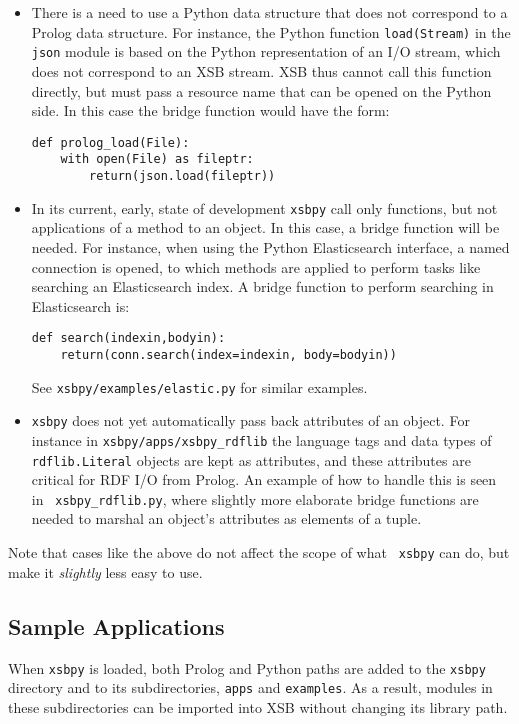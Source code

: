 \begin{itemize}
  \item There is a need to use a Python data structure that does not
    correspond to a Prolog data structure.  For instance, the Python
    function {\tt load(Stream)} in the {\tt json} module is based on
    the Python representation of an I/O stream, which does not
    correspond to an XSB stream.  XSB thus cannot call this function
    directly, but must pass a resource name that can be opened on the
    Python side.  In this case the bridge function would have the
    form:

\begin{verbatim}   
def prolog_load(File):
    with open(File) as fileptr:
        return(json.load(fileptr))
\end{verbatim}

\item In its current, early, state of development {\tt xsbpy} call
  only functions, but not applications of a method to an object. In
  this case, a bridge function will be needed.  For instance, when
  using the Python Elasticsearch interface, a named connection is
  opened, to which methods are applied to perform tasks like searching
  an Elasticsearch index.  A bridge function to perform searching in
  Elasticsearch is:

\begin{verbatim}
def search(indexin,bodyin):
    return(conn.search(index=indexin, body=bodyin))
\end{verbatim}

\noindent
See {\tt xsbpy/examples/elastic.py} for similar examples.

\item {\tt xsbpy} does not yet automatically pass back attributes of
  an object.  For instance in {\tt xsbpy/apps/xsbpy\_rdflib} the
  language tags and data types of {\tt rdflib.Literal} objects are
  kept as attributes, and these attributes are critical for RDF I/O
  from Prolog. An example of how to handle this is seen in {\tt
    xsbpy\_rdflib.py}, where slightly more elaborate bridge functions
  are needed to marshal an object's attributes as elements of a tuple.

\end{itemize}

Note that cases like the above do not affect the scope of what {\tt
  xsbpy} can do, but make it {\em slightly} less easy to use.

\subsection{Sample Applications}
When {\tt xsbpy} is loaded, both Prolog and Python paths are added to
the {\tt xsbpy} directory and to its subdirectories, {\tt apps} and
{\tt examples}.  As a result, modules in these subdirectories can be
imported into XSB without changing its library path.

